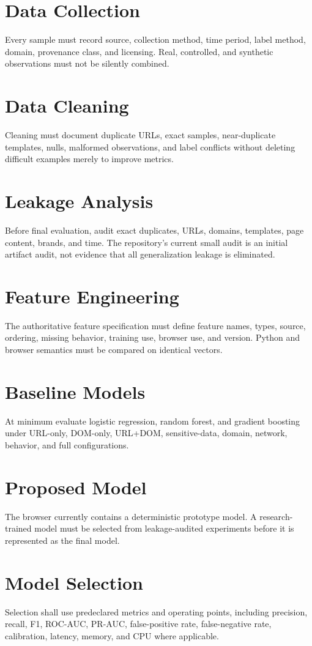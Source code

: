 \documentclass[journal]{IEEEtran}
\begin{document}
\section{Data Collection}
Every sample must record source, collection method, time period, label method, domain, provenance class, and licensing. Real, controlled, and synthetic observations must not be silently combined.

\section{Data Cleaning}
Cleaning must document duplicate URLs, exact samples, near-duplicate templates, nulls, malformed observations, and label conflicts without deleting difficult examples merely to improve metrics.

\section{Leakage Analysis}
Before final evaluation, audit exact duplicates, URLs, domains, templates, page content, brands, and time. The repository's current small audit is an initial artifact audit, not evidence that all generalization leakage is eliminated.

\section{Feature Engineering}
The authoritative feature specification must define feature names, types, source, ordering, missing behavior, training use, browser use, and version. Python and browser semantics must be compared on identical vectors.

\section{Baseline Models}
At minimum evaluate logistic regression, random forest, and gradient boosting under URL-only, DOM-only, URL+DOM, sensitive-data, domain, network, behavior, and full configurations.

\section{Proposed Model}
The browser currently contains a deterministic prototype model. A research-trained model must be selected from leakage-audited experiments before it is represented as the final model.

\section{Model Selection}
Selection shall use predeclared metrics and operating points, including precision, recall, F1, ROC-AUC, PR-AUC, false-positive rate, false-negative rate, calibration, latency, memory, and CPU where applicable.
\end{document}
